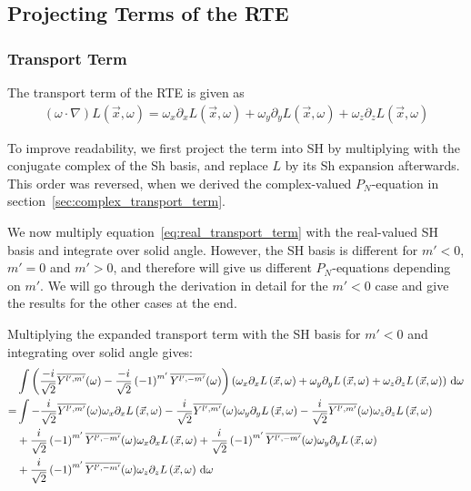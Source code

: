 \documentclass[10pt]{scrartcl}
\begin{document}
\subsection{Projecting Terms of the RTE}

\subsubsection{Transport Term}

The transport term of the RTE is given as
\begin{align}
(\omega\cdot\nabla)L(\vec{x}, \omega)
=
\omega_{x}\partial_xL\left (\vec{x} ,\omega \right )+\omega_{y}\partial_yL\left (\vec{x} ,\omega \right )+\omega_{z}\partial_zL\left (\vec{x} ,\omega \right )
\label{eq:real_transport_term}
\end{align}

To improve readability, we first project the term into SH by multiplying with the conjugate complex of the Sh basis, and replace $L$ by its Sh expansion afterwards. This order was reversed, when we derived the complex-valued $P_N$-equation in section~\ref{sec:complex_transport_term}.

We now multiply equation~\ref{eq:real_transport_term} with the real-valued SH basis and integrate over solid angle. However, the SH basis is different for $m'<0$, $m'=0$ and $m'>0$, and therefore will give us different $P_N$-equations depending on $m'$. We will go through the derivation in detail for the $m'<0$ case and give the results for the other cases at the end.

Multiplying the expanded transport term with the SH basis for $m'<0$ and integrating over solid angle gives:
\begin{align*}
&\int{\left(\frac{-i}{\sqrt{2}}\overline{Y^{l', m'}}(\omega )-\frac{-i}{\sqrt{2}}\left({-1}\right)^{m'}\overline{Y^{l', -m'}}(\omega )\right)\left(\omega_{x}\partial_xL\left (\vec{x} ,\omega \right )+\omega_{y}\partial_yL\left (\vec{x} ,\omega \right )+\omega_{z}\partial_zL\left (\vec{x} ,\omega \right )\right)\,\mathrm{d}\omega}
\\
=&
\int-\frac{i}{\sqrt{2}}\overline{Y^{l', m'}}(\omega )\omega_{x}\partial_xL\left (\vec{x} ,\omega \right )-\frac{i}{\sqrt{2}}\overline{Y^{l', m'}}(\omega )\omega_{y}\partial_yL\left (\vec{x} ,\omega \right )-\frac{i}{\sqrt{2}}\overline{Y^{l', m'}}(\omega )\omega_{z}\partial_zL\left (\vec{x} ,\omega \right )
\\&
+\frac{i}{\sqrt{2}}\left({-1}\right)^{m'}\overline{Y^{l', -m'}}(\omega )\omega_{x}\partial_xL\left (\vec{x} ,\omega \right )+\frac{i}{\sqrt{2}}\left({-1}\right)^{m'}\overline{Y^{l', -m'}}(\omega )\omega_{y}\partial_yL\left (\vec{x} ,\omega \right )
\\&
+\frac{i}{\sqrt{2}}\left({-1}\right)^{m'}\overline{Y^{l', -m'}}(\omega )\omega_{z}\partial_zL\left (\vec{x} ,\omega \right )\,\mathrm{d}\omega
\end{align*}
\end{document}
